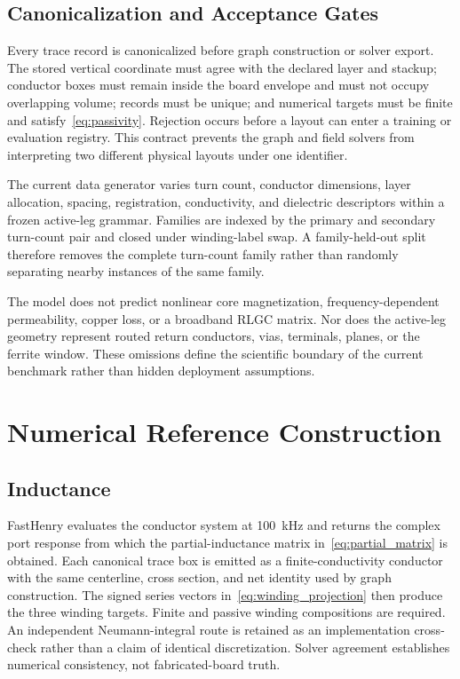 \documentclass[journal]{IEEEtran}
\begin{document}
\subsection{Canonicalization and Acceptance Gates}
Every trace record is canonicalized before graph construction or solver export. The stored vertical coordinate must agree with the declared layer and stackup; conductor boxes must remain inside the board envelope and must not occupy overlapping volume; records must be unique; and numerical targets must be finite and satisfy~\eqref{eq:passivity}. Rejection occurs before a layout can enter a training or evaluation registry. This contract prevents the graph and field solvers from interpreting two different physical layouts under one identifier.

The current data generator varies turn count, conductor dimensions, layer allocation, spacing, registration, conductivity, and dielectric descriptors within a frozen active-leg grammar. Families are indexed by the primary and secondary turn-count pair and closed under winding-label swap. A family-held-out split therefore removes the complete turn-count family rather than randomly separating nearby instances of the same family.

The model does not predict nonlinear core magnetization, frequency-dependent permeability, copper loss, or a broadband RLGC matrix. Nor does the active-leg geometry represent routed return conductors, vias, terminals, planes, or the ferrite window. These omissions define the scientific boundary of the current benchmark rather than hidden deployment assumptions.

\section{Numerical Reference Construction}
\subsection{Inductance}
FastHenry evaluates the conductor system at 100~kHz and returns the complex port response from which the partial-inductance matrix in~\eqref{eq:partial_matrix} is obtained. Each canonical trace box is emitted as a finite-conductivity conductor with the same centerline, cross section, and net identity used by graph construction. The signed series vectors in~\eqref{eq:winding_projection} then produce the three winding targets. Finite and passive winding compositions are required. An independent Neumann-integral route is retained as an implementation cross-check rather than a claim of identical discretization. Solver agreement establishes numerical consistency, not fabricated-board truth.
\end{document}
